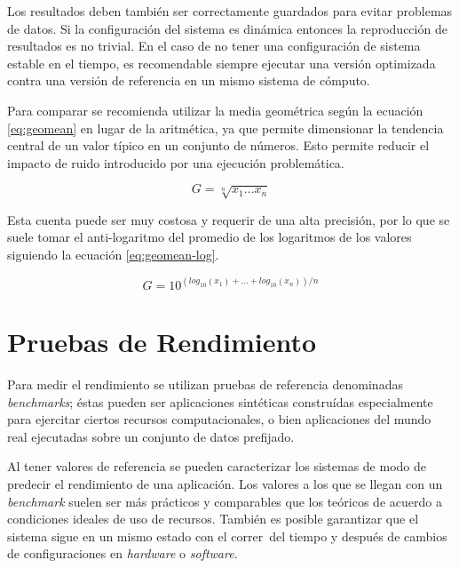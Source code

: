 \documentclass[a4paper]{report}
\begin{document}
Los resultados deben también ser correctamente guardados para evitar
problemas de datos. Si la configuración del sistema es dinámica entonces la
reproducción de resultados es no trivial. En el caso de no tener una
configuración de sistema estable en el tiempo, es recomendable siempre
ejecutar una versión optimizada contra una versión de referencia en un mismo
sistema de cómputo.

\bigskip

Para comparar se recomienda utilizar la media geométrica según la ecuación \ref{eq:geomean} en lugar de la aritmética, ya que permite dimensionar la tendencia central de un valor típico en un conjunto
de números. Esto permite reducir el impacto de ruido introducido por una ejecución
problemática.

\begin{equation}
\label{eq:geomean}
G = \sqrt[n]{x_{1} \ldots x_{n}}
\end{equation}

Esta cuenta puede ser muy costosa y requerir de una alta precisión, por lo que se
suele tomar el anti-logaritmo del promedio de los logaritmos de los valores siguiendo
la ecuación \ref{eq:geomean-log}.

\begin{equation}
\label{eq:geomean-log}
G = 10 ^{( log _{10} (x_{1}) + \ldots + log _{10} (x_{n}) ) / n}
\end{equation}

\bigskip

\section{Pruebas de Rendimiento}

Para medir el rendimiento se utilizan pruebas de referencia denominadas {\em benchmarks}; éstas pueden ser aplicaciones sintéticas construídas especialmente para ejercitar ciertos recursos computacionales, o bien
aplicaciones del mundo real ejecutadas sobre un conjunto de datos prefijado.

\bigskip

Al tener valores de referencia se pueden caracterizar los sistemas de modo de predecir el rendimiento de una aplicación.
Los valores a los que se llegan con un {\it benchmark} suelen ser más prácticos y
comparables que los teóricos de acuerdo a condiciones ideales de uso de recursos.
También es posible garantizar que el sistema sigue en un mismo estado con el correr\
del tiempo y después de cambios de configuraciones en {\it hardware} o {\it software}.
\end{document}

